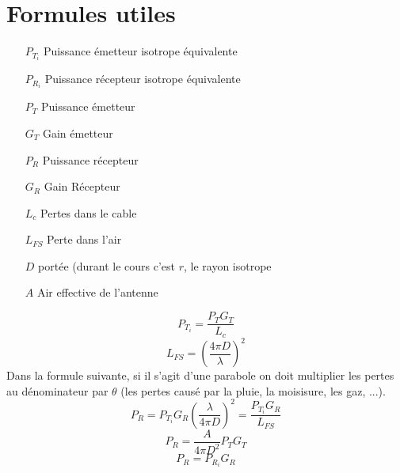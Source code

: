 \documentclass[a4paper, 11pt]{article}
\begin{document}
\section*{Formules utiles}

\begin{itemize}
\item[$P_{T_i}$] Puissance émetteur isotrope équivalente
\item[$P_{R_i}$] Puissance récepteur isotrope équivalente
\item[$P_T$] Puissance émetteur
\item[$G_T$] Gain émetteur
\item[$P_R$] Puissance récepteur
\item[$G_R$] Gain Récepteur
\item[$L_c$] Pertes dans le cable
\item[$L_{FS}$] Perte dans l'air
\item[$D$] portée (durant le cours c'est $r$, le rayon isotrope
\item[$A$] Air effective de l'antenne
\end{itemize}

$$P_{T_i} = \frac{P_TG_T}{L_c}$$
$$L_{FS} = \left(\frac{4\pi D}{\lambda}\right)^2$$
Dans la formule suivante, si il s'agit d'une parabole on doit multiplier les pertes au dénominateur par $\theta$ (les pertes causé par la pluie, la moisisure, les gaz, ...).
$$P_R = P_{T_i}G_R \left(\frac{\lambda}{4\pi D}\right)^2=\frac{P_{T_i}G_R}{L_{FS}}$$
$$P_R = \frac{A}{4\pi D^2}P_TG_T$$
$$P_R = P_{R_i}G_R$$
\end{document}
